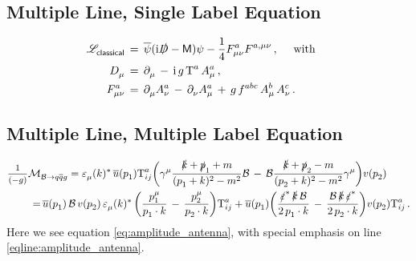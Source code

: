 \subsection{Multiple Line, Single Label Equation}

\begin{align} \begin{split}
	\mathscr{L}_{\textsf{classical}}^{} \,&=\, 
	\overline{\psi} ( {\rm i} \slashed{D} - {\sf M} ) \psi - \frac{1}{4} F^{a}_{\mu\nu} F^{a,\mu\nu}_{} \,,
	\quad\textrm{ with }\quad\\
	D_{\mu}^{} \,&=\, \partial_{\mu}^{} \,-\, {\rm i}\,g\, \textrm{T}_{}^{a} \, A^{a}_{\mu} \,,\\
	F^{a}_{\mu\nu} \,&=\, \partial_{\mu}^{} A^{a}_{\nu} \,-\, \partial_{\nu}^{} A^{a}_{\mu}
	\,+\, g\, f_{}^{abc}\,A^{b}_{\mu}\,A^{c}_{\nu}\,.
\end{split} \end{align}

\subsection{Multiple Line, Multiple Label Equation}

\begin{subequations} \begin{align}
		\mfrac{1}{(-g)} \mathcal{M}&\sub{\mathcal{B} \rightarrow q\overline{q}g }
		=
		\varepsilon\sub{\mu}(k)\upp{*} \,
		\overline{u}(p\sub{1})
		\textrm{T}\ind{a}{ij}
		\bigg(
		\gamma\upp{\mu}
		\frac{ \slashed{k} + \slashed{p}\sub{1} + m }{ (p\sub{1} + k)\upp{2} - m\upp{2} }
		\mathcal{B}
		\,-\,
		\mathcal{B}
		\frac{ \slashed{k} + \slashed{p}\sub{2} - m }{ (p\sub{2} + k)\upp{2} - m\upp{2} }
		\gamma\upp{\mu}
		\bigg)
		v(p\sub{2})
		\\
		=&\,
		\overline{u}(p\sub{1})
		\, \mathcal{B} \,
		v(p\sub{2}) \,
		\varepsilon\sub{\mu}(k)\upp{*} \,
		\bigg(
		\frac{ p\ind{\mu}{1} }{ p\sub{1}\cdot k }
		\,-\,
		\frac{ p\ind{\mu}{2} }{ p\sub{2}\cdot k }
		\bigg) \textrm{T}\ind{a}{ij}
		+ \overline{u}(p\sub{1})
		\bigg(
		\frac{ \slashed{\varepsilon}\upp{*} \, \slashed{k} \, \mathcal{B} }{ 2 \, p\sub{1}\cdot k }
		\,-\,
		\frac{ \mathcal{B} \, \slashed{k} \, \slashed{\varepsilon}\upp{*} }{ 2 \, p\sub{2}\cdot k }
		\bigg)
		v(p\sub{2})
		\textrm{T}\ind{a}{ij}
		\label{eqline:amplitude_antenna}
		\,.
\end{align} \label{eq:amplitude_antenna} 
\end{subequations}
%
Here we see equation \eqref{eq:amplitude_antenna}, with special emphasis on line \eqref{eqline:amplitude_antenna}.



